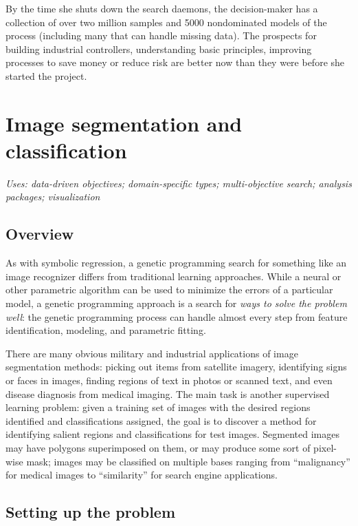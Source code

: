 \documentclass[12pt]{article}
\begin{document}
By the time she shuts down the search daemons, the decision-maker has a collection of over two million samples and 5000 nondominated models of the process (including many that can handle missing data). The prospects for building industrial controllers, understanding basic principles, improving processes to save money or reduce risk are better now than they were before she started the project.

\section{Image segmentation and classification}

\textit{Uses: data-driven objectives; domain-specific types; multi-objective search; analysis packages; visualization}

\subsection{Overview}


As with symbolic regression, a genetic programming search for something like an image recognizer differs from traditional learning approaches. While a neural or other parametric algorithm can be used to minimize the errors of a particular model, a genetic programming approach is a search for \emph{ways to solve the problem well}: the genetic programming process can handle almost every step from feature identification, modeling, and parametric fitting.

There are many obvious military and industrial applications of image segmentation methods: picking out items from satellite imagery, identifying signs or faces in images, finding regions of text in photos or scanned text, and even disease diagnosis from medical imaging. The main task is another supervised learning problem: given a training set of images with the desired regions identified and classifications assigned, the goal is to discover a method for identifying salient regions and classifications for test images. Segmented images may have polygons superimposed on them, or may produce some sort of pixel-wise mask; images may be classified on multiple bases ranging from ``malignancy'' for medical images to ``similarity'' for search engine applications.

\subsection{Setting up the problem}
\end{document}
